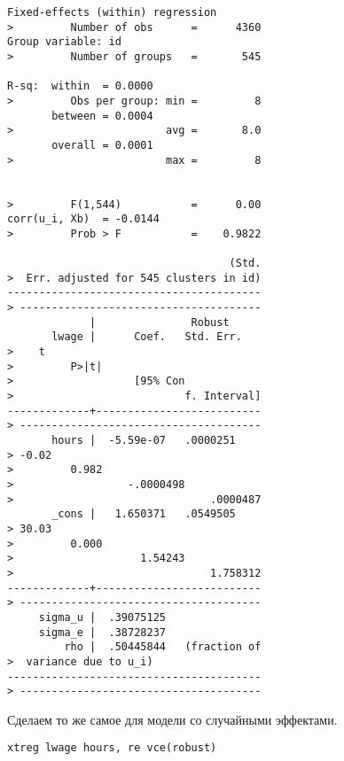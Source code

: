 \documentclass[]{article}
\begin{document}
\begin{verbatim}
Fixed-effects (within) regression       
>         Number of obs      =      4360
Group variable: id                      
>         Number of groups   =       545

R-sq:  within  = 0.0000                 
>         Obs per group: min =         8
       between = 0.0004                 
>                        avg =       8.0
       overall = 0.0001                 
>                        max =         8

                                        
>         F(1,544)           =      0.00
corr(u_i, Xb)  = -0.0144                
>         Prob > F           =    0.9822

                                   (Std.
>  Err. adjusted for 545 clusters in id)
----------------------------------------
> --------------------------------------
             |               Robust
       lwage |      Coef.   Std. Err.   
>    t                                  
>         P>|t|                         
>                   [95% Con            
>                           f. Interval]
-------------+--------------------------
> --------------------------------------
       hours |  -5.59e-07   .0000251    
> -0.02                                 
>         0.982                         
>                  -.0000498            
>                               .0000487
       _cons |   1.650371   .0549505    
> 30.03                                 
>         0.000                         
>                    1.54243            
>                               1.758312
-------------+--------------------------
> --------------------------------------
     sigma_u |  .39075125
     sigma_e |  .38728237
         rho |  .50445844   (fraction of
>  variance due to u_i)
----------------------------------------
> --------------------------------------
\end{verbatim}

Сделаем то же самое для модели со случайными эффектами.

\begin{verbatim}
xtreg lwage hours, re vce(robust)
\end{verbatim}
\end{document}
